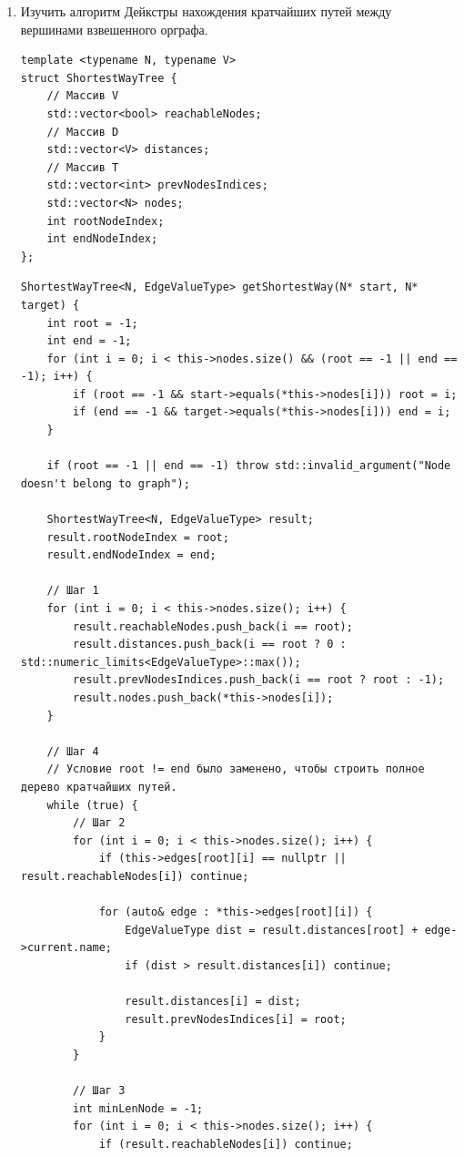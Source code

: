 \documentclass[a4paper,14pt]{extarticle}
\begin{document}
\begin{enumerate}[1.]
    \item Изучить алгоритм Дейкстры нахождения кратчайших путей между вершинами взвешенного орграфа.\\
        \begin{verbatim}
template <typename N, typename V>
struct ShortestWayTree {
    // Массив V
    std::vector<bool> reachableNodes;
    // Массив D
    std::vector<V> distances;
    // Массив T
    std::vector<int> prevNodesIndices;
    std::vector<N> nodes;
    int rootNodeIndex;
    int endNodeIndex;
};
        \end{verbatim}
        \begin{verbatim}
ShortestWayTree<N, EdgeValueType> getShortestWay(N* start, N* target) {
    int root = -1;
    int end = -1;
    for (int i = 0; i < this->nodes.size() && (root == -1 || end == -1); i++) {
        if (root == -1 && start->equals(*this->nodes[i])) root = i;
        if (end == -1 && target->equals(*this->nodes[i])) end = i;
    }

    if (root == -1 || end == -1) throw std::invalid_argument("Node doesn't belong to graph");

    ShortestWayTree<N, EdgeValueType> result;
    result.rootNodeIndex = root;
    result.endNodeIndex = end;

    // Шаг 1
    for (int i = 0; i < this->nodes.size(); i++) {
        result.reachableNodes.push_back(i == root);
        result.distances.push_back(i == root ? 0 : std::numeric_limits<EdgeValueType>::max());
        result.prevNodesIndices.push_back(i == root ? root : -1);
        result.nodes.push_back(*this->nodes[i]);
    }

    // Шаг 4
    // Условие root != end было заменено, чтобы строить полное дерево кратчайших путей.
    while (true) {
        // Шаг 2
        for (int i = 0; i < this->nodes.size(); i++) {
            if (this->edges[root][i] == nullptr || result.reachableNodes[i]) continue;

            for (auto& edge : *this->edges[root][i]) {
                EdgeValueType dist = result.distances[root] + edge->current.name;
                if (dist > result.distances[i]) continue;
            
                result.distances[i] = dist;
                result.prevNodesIndices[i] = root;
            }
        }

        // Шаг 3
        int minLenNode = -1;
        for (int i = 0; i < this->nodes.size(); i++) {
            if (result.reachableNodes[i]) continue;


\end{verbatim}
\end{enumerate}
\end{document}
